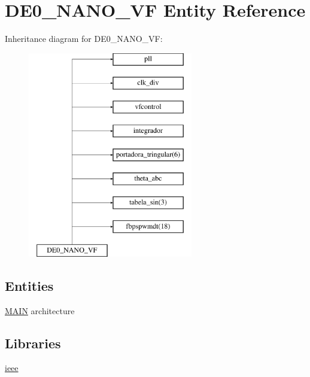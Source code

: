 \hypertarget{class_d_e0___n_a_n_o___v_f}{}\section{D\+E0\+\_\+\+N\+A\+N\+O\+\_\+\+V\+F Entity Reference}
\label{class_d_e0___n_a_n_o___v_f}
Inheritance diagram for D\+E0\+\_\+\+N\+A\+N\+O\+\_\+\+V\+F\+:\begin{figure}[H]
\begin{center}
\leavevmode
\includegraphics[height=9.000000cm]{class_d_e0___n_a_n_o___v_f}
\end{center}
\end{figure}
\subsection*{Entities}
\begin{DoxyCompactItemize}
\item 
\hyperlink{class_d_e0___n_a_n_o___v_f_1_1_m_a_i_n}{M\+A\+I\+N} architecture
\end{DoxyCompactItemize}
\subsection*{Libraries}
 \begin{DoxyCompactItemize}
\item 
\hyperlink{class_d_e0___n_a_n_o___v_f_a0a6af6eef40212dbaf130d57ce711256}{ieee} 
\end{DoxyCompactItemize}
